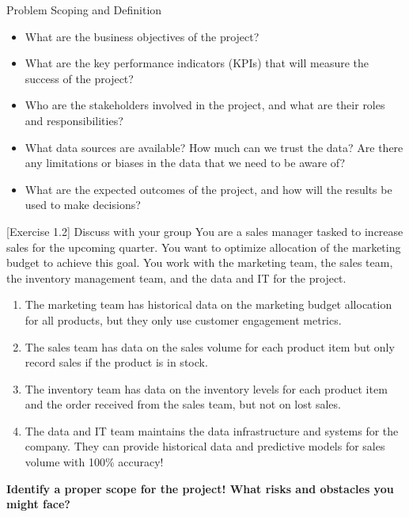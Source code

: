 \documentclass [xcolor=svgnames, handout]{beamer}
\begin{document}
\begin{frame}{Problem Scoping and Definition}
    \begin{itemize}[<+->]
        \item What are the business objectives of the project?
        \item What are the key performance indicators (KPIs) that will measure the success of the project?
        \item Who are the stakeholders involved in the project, and what are their roles and responsibilities?
        \item What data sources are available? How much can we trust the data? Are there any limitations or biases in the data that we need to be aware of?
        \item What are the expected outcomes of the project, and how will the results be used to make decisions?
    \end{itemize}
\end{frame}

\begin{frame}{[Exercise 1.2] Discuss with your group}
    You are a sales manager tasked to increase sales for the upcoming quarter. You want to optimize allocation of the marketing budget to achieve this goal. You work with the marketing team, the sales team, the inventory management team, and the data and IT for the project.
    
    \begin{enumerate}
        \item The marketing team has historical data on the marketing budget allocation for all products, but they only use customer engagement metrics.
        \item The sales team has data on the sales volume for each product item but only record sales if the product is in stock.
        \item The inventory team has data on the inventory levels for each product item and the order received from the sales team, but not on lost sales.
        \item The data and IT team maintains the data infrastructure and systems for the company. They can provide historical data and predictive models for sales volume with 100\% accuracy!
    \end{enumerate}
    
    \textbf{Identify a proper scope for the project! What risks and obstacles you might face?}
\end{frame}
\end{document}
